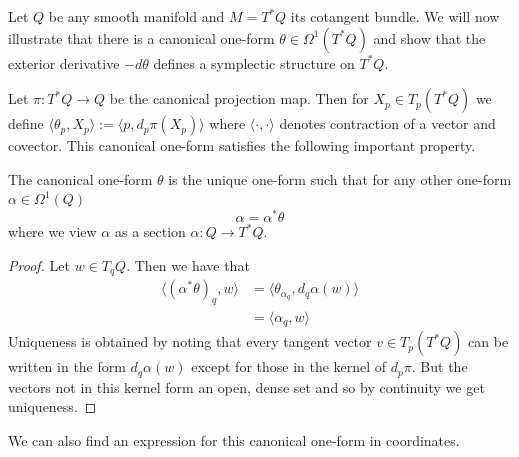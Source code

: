 \begin{eg}
    Let $Q$ be any smooth manifold and $M = T^*Q$ its cotangent bundle.
    We will now illustrate that there is a canonical one-form $\theta \in \Omega^1(T^*Q)$
    and show that the exterior derivative $-d\theta$ defines a symplectic structure on $T^*Q$.

    Let $\pi : T^*Q \to Q$ be the canonical projection map. Then for $X_p \in
        T_p(T^*Q)$ we define $\langle \theta_p , X_p \rangle := \langle p , d_p\pi(X_p)
        \rangle$ where $\langle \cdot , \cdot \rangle$ denotes contraction of a vector
    and covector. This canonical one-form satisfies the following important
    property.
    \begin{lemma}
        The canonical one-form $\theta$ is the unique one-form such that for any other one-form $\alpha \in \Omega^1(Q)$
        $$\alpha = \alpha^* \theta$$
        where we view $\alpha$ as a section $\alpha: Q \to T^*Q$.
    \end{lemma}
    \begin{proof}
        Let $w \in T_qQ$. Then we have that
        \begin{align*}
            \langle (\alpha^*\theta)_q , w \rangle & = \langle \theta_{\alpha_q} , d_q\alpha (w) \rangle \\
                                                   & = \langle \alpha_q , w \rangle
        \end{align*}
        Uniqueness is obtained by noting that every tangent vector $v \in T_p(T^*Q)$ can be written in the form $d_q\alpha(w)$
        except for those in the kernel of $d_p\pi$. But the vectors not in this kernel form an open, dense set and so by continuity we get uniqueness.
    \end{proof}

    We can also find an expression for this canonical one-form in coordinates.


\end{eg}
